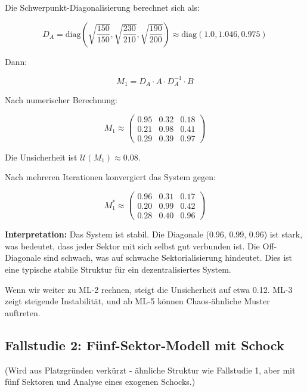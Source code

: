 \documentclass[a4paper,12pt]{article}
\theoremstyle{definition}
\begin{document}
Die Schwerpunkt-Diagonalisierung berechnet sich als:

\begin{equation}
D_A = \text{diag}\left(\sqrt{\frac{150}{150}}, \sqrt{\frac{230}{210}}, \sqrt{\frac{190}{200}}\right)
\approx \text{diag}(1.0, 1.046, 0.975)
\end{equation}

Dann:

\begin{equation}
M_1 = D_A \cdot A \cdot D_A^{-1} \cdot B
\end{equation}

Nach numerischer Berechnung:

\begin{equation}
M_1 \approx \begin{pmatrix}
0.95 & 0.32 & 0.18 \\
0.21 & 0.98 & 0.41 \\
0.29 & 0.39 & 0.97
\end{pmatrix}
\end{equation}

Die Unsicherheit ist $\mathcal{U}(M_1) \approx 0.08$.

Nach mehreren Iterationen konvergiert das System gegen:

\begin{equation}
M_1^* \approx \begin{pmatrix}
0.96 & 0.31 & 0.17 \\
0.20 & 0.99 & 0.42 \\
0.28 & 0.40 & 0.96
\end{pmatrix}
\end{equation}

\textbf{Interpretation:} Das System ist stabil. Die Diagonale (0.96, 0.99, 0.96) ist stark, was bedeutet, dass jeder Sektor mit sich selbst gut verbunden ist. Die Off-Diagonale sind schwach, was auf schwache Sektorialisierung hindeutet. Dies ist eine typische stabile Struktur für ein dezentralisiertes System.

Wenn wir weiter zu ML-2 rechnen, steigt die Unsicherheit auf etwa 0.12. ML-3 zeigt steigende Instabilität, und ab ML-5 können Chaos-ähnliche Muster auftreten.

\subsection{Fallstudie 2: Fünf-Sektor-Modell mit Schock}

(Wird aus Platzgründen verkürzt - ähnliche Struktur wie Fallstudie 1, aber mit fünf Sektoren und Analyse eines exogenen Schocks.)
\end{document}
